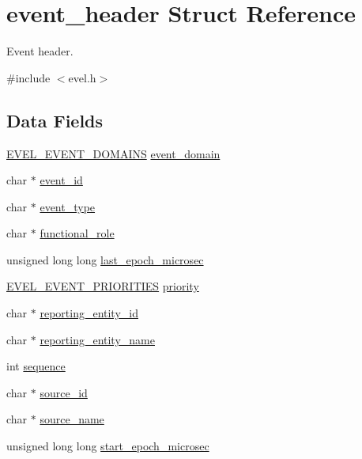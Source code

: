 \hypertarget{structevent__header}{}\section{event\+\_\+header Struct Reference}
\label{structevent__header}


Event header.  




{\ttfamily \#include $<$evel.\+h$>$}

\subsection*{Data Fields}
\begin{DoxyCompactItemize}
\item 
\hyperlink{evel_8h_ac34d44f4f90f2b63828a32ca9c7b0855}{E\+V\+E\+L\+\_\+\+E\+V\+E\+N\+T\+\_\+\+D\+O\+M\+A\+I\+N\+S} \hyperlink{structevent__header_a191eca173d8bd260c598a2b79a026ab1}{event\+\_\+domain}
\item 
char $\ast$ \hyperlink{structevent__header_a8123ea69f23cf078fc39304d6eeb6c26}{event\+\_\+id}
\item 
char $\ast$ \hyperlink{structevent__header_a39ed6782a7cfa1bf51d9ba35e92cc803}{event\+\_\+type}
\item 
char $\ast$ \hyperlink{structevent__header_a12896af9697cc5e5b678123a381c5086}{functional\+\_\+role}
\item 
unsigned long long \hyperlink{structevent__header_a5b7f178cb9755cc1f2b635e6c615133c}{last\+\_\+epoch\+\_\+microsec}
\item 
\hyperlink{evel_8h_ad1bf6807fa6710332251611207490484}{E\+V\+E\+L\+\_\+\+E\+V\+E\+N\+T\+\_\+\+P\+R\+I\+O\+R\+I\+T\+I\+E\+S} \hyperlink{structevent__header_a864abe4580ddd9c0b86a2df7fa19fbbe}{priority}
\item 
char $\ast$ \hyperlink{structevent__header_a43987af0098095813752ad1ca6d295d6}{reporting\+\_\+entity\+\_\+id}
\item 
char $\ast$ \hyperlink{structevent__header_a105ed7207010f12bb7ffccf3cb712536}{reporting\+\_\+entity\+\_\+name}
\item 
int \hyperlink{structevent__header_a3640c2b0a997500273b6db73f050ff10}{sequence}
\item 
char $\ast$ \hyperlink{structevent__header_a713d1a737d2b3330c008863fea17797b}{source\+\_\+id}
\item 
char $\ast$ \hyperlink{structevent__header_a5619697d328950141c426df951988f94}{source\+\_\+name}
\item 
unsigned long long \hyperlink{structevent__header_af1abe603869530794daf1f4969c6b50c}{start\+\_\+epoch\+\_\+microsec}
\end{DoxyCompactItemize}


